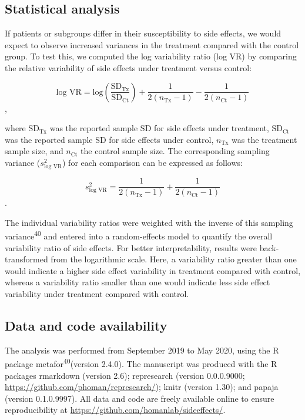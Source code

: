 \documentclass[
  9pt,
  english,
  ,jou,floatsintext]{apa6}
\begin{document}
\hypertarget{statistical-analysis}{%
\subsection{Statistical analysis}\label{statistical-analysis}}

If patients or subgroups differ in their susceptibility to side effects,
we would expect to observe increased variances in the treatment
compared with the control group. To test this, we computed the log
variability ratio (log VR) by comparing the relative variability of
side effects under treatment versus control:

\[\textrm{log VR}=\textrm{log}\left(\frac{\textrm{SD}_{\textrm{Tx}}}{\textrm{SD}_{\textrm{Ct}}} \right) +
\frac{1}{2(n_{\textrm{Tx}}-1)} - \frac{1}{2(n_{\textrm{Ct}}-1)} \],

where \(\textrm{SD}_{\textrm{Tx}}\) was the reported sample SD for side
effects under treatment, \(\textrm{SD}_{\textrm{Ct}}\) was the reported
sample SD for side effects under control, \(n_{\textrm{Tx}}\) was the
treatment sample size, and \(n_{\textrm{Ct}}\) the control sample size. The
corresponding sampling variance (\(s_{\textrm{log VR}}^2\)) for each
comparison can be expressed as follows:

\[ s_{\textrm{log VR}}^2 = \frac{1}{2(n_{\textrm{Tx}}-1)} + \frac{1}{2(n_{\textrm{Ct}}-1)}\].

The individual variability ratios were weighted with the inverse of
this sampling variance\textsuperscript{40} and entered into a
random-effects model to quantify the overall variability ratio of side
effects. For better interpretability, results were back-transformed from
the logarithmic scale. Here, a variability ratio greater than one would
indicate a higher side effect variability in treatment compared with
control, whereas a variability ratio smaller than one would indicate less
side effect variability under treatment compared with control.

\hypertarget{data-and-code-availability}{%
\subsection{Data and code availability}\label{data-and-code-availability}}

The analysis was performed from September 2019 to May 2020, using the
R package metafor\textsuperscript{40}(version 2.4.0).
The manuscript was produced with the R packages rmarkdown
(version 2.6); represearch
(version 0.0.0.9000;
\url{https://github.com/phoman/represearch/});
knitr (version 1.30); and
papaja (version 0.1.0.9997).
All data and code are freely available online to ensure reproducibility at
\url{https://github.com/homanlab/sideeffects/}.
\end{document}
